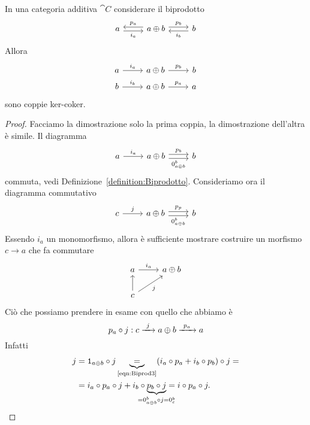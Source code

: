 \begin{lemma}\label{lemma:KerCokerInjProj}
  In una categoria additiva \(\cat C\) considerare il biprodotto
  \[
    \begin{tikzcd}
      a \ar["{i_a}", r, shift right, swap] & a \oplus b \ar["{p_a}",
      l, shift right, swap] \ar["{p_b}", r, shift left] & b
      \ar["{i_b}", l, shift left]
    \end{tikzcd}
  \]
  Allora
  \[
    \begin{tikzcd}[row sep=tiny]
      a \ar["{i_a}", r] & a \oplus b \ar["{p_b}", r] & b \\
      b \ar["{i_b}", r] & a \oplus b \ar["{p_a}", r] & a
    \end{tikzcd}
  \]
  sono coppie ker-coker.
\end{lemma}

\begin{proof}
  Facciamo la dimostrazione solo la prima coppia, la dimostrazione
  dell'altra è simile. Il diagramma
  \[
    \begin{tikzcd}
      a \ar["{i_a}", r] & a \oplus b \ar["{p_b}", r, shift left]
      \ar["{0_{a \oplus b}^b}", r, shift right, swap] & b
    \end{tikzcd}
  \]
  commuta, vedi Definizione~\ref{definition:Biprodotto}. Consideriamo
  ora il diagramma commutativo
  \[
    \begin{tikzcd}
      c \ar["{j}", r] & a \oplus b \ar["{p_p}", r, shift left]
      \ar["{0_{a \oplus b}^b}", r, shift right, swap] & b
    \end{tikzcd}
  \]
  Essendo \(i_a\) un monomorfismo, allora è sufficiente mostrare
  costruire un morfismo \(c \to a\) che fa commutare
  \[
    \begin{tikzcd}
      a \ar["{i_a}",r] & a \oplus b \\
      c \ar[u] \ar["{j}", ur, swap]
    \end{tikzcd}
  \]
  Ciò che possiamo prendere in esame con quello che abbiamo è
  \[
    p_a \circ j : c \xrightarrow{\ j\ } a \oplus b \xrightarrow{\ p_a\ } a
  \]
  Infatti
  \begin{align*}
    j &= \id_{a \oplus b} \circ j \underbrace{=}_{\text{\eqref{eqn:Biprod3}}}
        (i_a \circ p_a + i_b \circ p_b) \circ j = \\
      &= i_a \circ p_a \circ j + i_b \circ \underbrace{p_b \circ j}_{\mathclap{\cramped{= 0_{a \oplus b}^b
        \circ j = 0_c^b}}} = i \circ p_a \circ j . \qedhere
  \end{align*}
\end{proof}

